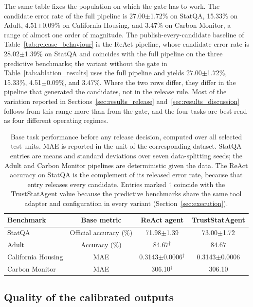 \documentclass[preprint,12pt,authoryear]{elsarticle}
\begin{document}
The same table fixes the population on which the gate has to work.
The candidate error rate of the full pipeline is 27.00$\pm$1.72\% on StatQA, 15.33\% on Adult, 4.51$\pm$0.09\% on California Housing, and 3.47\% on Carbon Monitor, a range of almost one order of magnitude.
The publish-every-candidate baseline of Table~\ref{tab:release_behaviour} is the ReAct pipeline, whose candidate error rate is 28.02$\pm$1.39\% on StatQA and coincides with the full pipeline on the three predictive benchmarks; the variant without the gate in Table~\ref{tab:ablation_results} uses the full pipeline and yields 27.00$\pm$1.72\%, 15.33\%, 4.51$\pm$0.09\%, and 3.47\%.
Where the two rows differ, they differ in the pipeline that generated the candidates, not in the release rule.
Most of the variation reported in Sections~\ref{sec:results_release} and~\ref{sec:results_discussion} follows from this range more than from the gate, and the four tasks are best read as four different operating regimes.

\begin{table}[t]
\centering
\small
\caption{Base task performance before any release decision, computed over all selected test units. MAE is reported in the unit of the corresponding dataset. StatQA entries are means and standard deviations over seven data-splitting seeds; the Adult and Carbon Monitor pipelines are deterministic given the data. The ReAct accuracy on StatQA is the complement of its released error rate, because that entry releases every candidate. Entries marked $\dagger$ coincide with the TrustStatAgent value because the predictive benchmarks share the same tool adapter and configuration in every variant (Section~\ref{sec:execution}).}
\label{tab:base_performance}
\begin{tabularx}{\linewidth}{@{}lccc@{}}
\toprule
\textbf{Benchmark} & \textbf{Base metric} & \textbf{ReAct agent} & \textbf{TrustStatAgent}\\
\midrule
StatQA & Official accuracy (\%) & 71.98$\pm$1.39 & 73.00$\pm$1.72\\
Adult & Accuracy (\%) & 84.67$^\dagger$ & 84.67\\
California Housing & MAE & 0.3143$\pm$0.0006$^\dagger$ & 0.3143$\pm$0.0006\\
Carbon Monitor & MAE & 306.10$^\dagger$ & 306.10\\
\bottomrule
\end{tabularx}
\end{table}

\subsection{Quality of the calibrated outputs}
\label{sec:results_calibration}
\end{document}
